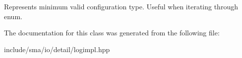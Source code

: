 Represents minimum valid configuration type. Useful when iterating through enum. 



The documentation for this class was generated from the following file\-:\begin{DoxyCompactItemize}
\item 
include/sma/io/detail/logimpl.\-hpp\end{DoxyCompactItemize}
